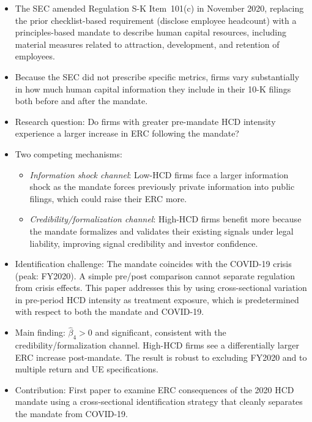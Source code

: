 \documentclass[12pt,english]{article}
\begin{document}
\begin{itemize}
    \item The SEC amended Regulation S-K Item~101(c) in November 2020,
          replacing the prior checklist-based requirement (disclose employee
          headcount) with a principles-based mandate to describe human capital
          resources, including material measures related to attraction,
          development, and retention of employees.
    \item Because the SEC did not prescribe specific metrics, firms vary
          substantially in how much human capital information they include in
          their 10-K filings both before and after the mandate.
    \item Research question: Do firms with greater pre-mandate HCD intensity
          experience a larger increase in ERC following the mandate?
    \item Two competing mechanisms:
          \begin{itemize}
              \item \emph{Information shock channel}: Low-HCD firms face a
                    larger information shock as the mandate forces previously
                    private information into public filings, which could raise
                    their ERC more.
              \item \emph{Credibility/formalization channel}: High-HCD firms
                    benefit more because the mandate formalizes and validates
                    their existing signals under legal liability, improving
                    signal credibility and investor confidence.
          \end{itemize}
    \item Identification challenge: The mandate coincides with the COVID-19
          crisis (peak: FY2020). A simple pre/post comparison cannot separate
          regulation from crisis effects. This paper addresses this by using
          cross-sectional variation in pre-period HCD intensity as treatment
          exposure, which is predetermined with respect to both the mandate
          and COVID-19.
    \item Main finding: $\hat{\beta}_4 > 0$ and significant, consistent with
          the credibility/formalization channel. High-HCD firms see a
          differentially larger ERC increase post-mandate. The result is
          robust to excluding FY2020 and to multiple return and UE
          specifications.
    \item Contribution: First paper to examine ERC consequences of the 2020
          HCD mandate using a cross-sectional identification strategy that
          cleanly separates the mandate from COVID-19.
\end{itemize}
\end{document}
